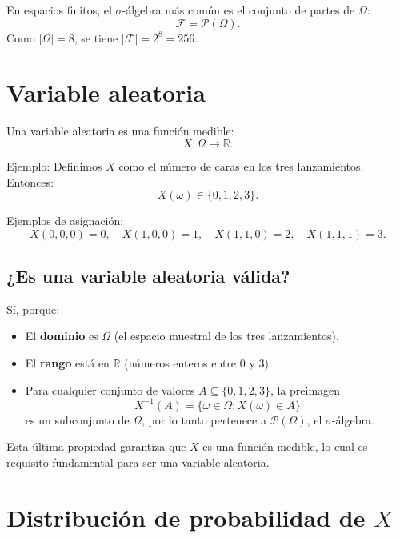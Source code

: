 \documentclass[12pt]{article}
\begin{document}
En espacios finitos, el $\sigma$-álgebra más común es el conjunto de partes de
$\Omega$:
\begin{equation*}
\mathcal{F} = \mathcal{P}(\Omega).
\end{equation*}
Como $|\Omega| = 8$, se tiene $|\mathcal{F}| = 2^8 = 256$.

\section{Variable aleatoria}

Una variable aleatoria es una función medible:
\begin{equation*}
X : \Omega \to \mathbb{R}.
\end{equation*}

Ejemplo: Definimos $X$ como el número de caras en los tres lanzamientos. Entonces:
\begin{equation*}
X(\omega) \in \{0,1,2,3\}.
\end{equation*}

\noindent Ejemplos de asignación:
\begin{equation*}
X(0,0,0) = 0, \quad X(1,0,0) = 1, \quad X(1,1,0) = 2, \quad X(1,1,1) = 3.
\end{equation*}

\subsection{¿Es una variable aleatoria válida?}

Sí, porque:
\begin{itemize}
    \item El \textbf{dominio} es $\Omega$ (el espacio muestral de los tres lanzamientos).
    \item El \textbf{rango} está en $\mathbb{R}$ (números enteros entre 0 y 3).
    \item Para cualquier conjunto de valores $A \subseteq \{0,1,2,3\}$, la preimagen
    \begin{equation*}
        X^{-1}(A) = \{\omega \in \Omega : X(\omega) \in A\}
    \end{equation*}
    es un subconjunto de $\Omega$, por lo tanto pertenece a $\mathcal{P}(\Omega)$, el $\sigma$-álgebra.
\end{itemize}

Esta última propiedad garantiza que $X$ es una función medible, lo cual es requisito fundamental para ser una variable aleatoria.

\section{Distribución de probabilidad de $X$}
\end{document}
